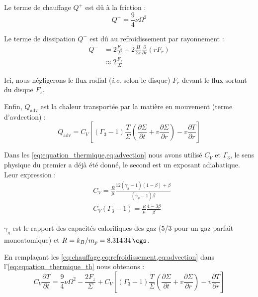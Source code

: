 Le terme de chauffage $Q^+$ est dû à la friction :
\begin{equation}
    \label{eq:chauffage}
    Q^+ = \frac{9}{4} \nu \Omega^2
\end{equation}

Le terme de dissipation $Q^-$ est dû au refroidissement par rayonnement :
\begin{align}
    Q^- &= 2 \frac{F_z}{\Sigma} + 2 \frac{H}{\Sigma r} \frac{\partial}{\partial r} \left(r F_r\right) \\
    \label{eq:refroidissement}
        &\approx 2 \frac{F_z}{\Sigma}
\end{align}

Ici, nous négligerons le flux radial (\textit{i.e.} selon le disque) $F_r$
devant le flux sortant du disque $F_z$.

Enfin, $Q_\mathrm{adv}$ est la chaleur transportée par la matière en mouvement
(terme d’avdection) : 
\begin{equation}
    \label{eq:advection}
    Q_\mathrm{adv} = C_V \left[ (\Gamma_3 - 1) \frac{T}{\Sigma} \left( \frac{\partial \Sigma}{\partial t} + v \frac{\partial \Sigma}{\partial r}  \right) - v \frac{\partial T}{\partial r} \right]
\end{equation}

Dans les \cref{eq:equation_thermique,eq:advection} nous avons utilisé $C_V$ et
$\Gamma_3$, le sens physique du premier a déjà été donné, le second est un
exposant adiabatique. Leur expression :
\begin{align}
    &C_V = \frac{R}{\mu} \frac{12 (\gamma_g - 1)(1 - \beta) + \beta}{(\gamma_g - 1) \beta} \\
    &C_V (\Gamma_3 - 1) = \frac{R}{\mu} \frac{4 - 3\beta}{\beta}
\end{align}

$\gamma_g$ est le rapport des capacités calorifiques des gaz (\num{5/3} pour un
gaz parfait monoatomique) et $R = k_B / m_p = \SI{8.31434}{\cgs}$.

En remplaçant les \cref{eq:chauffage,eq:refroidissement,eq:advection} dans
l’\cref{eq:equation_thermique_th} nous obtenons :
\begin{equation}
    \label{eq:equation_thermique}
    C_V \frac{\partial T}{\partial t} = \frac{9}{4} \nu \Omega^2 - \frac{2 F_z}{\Sigma} + C_V \left[ (\Gamma_3 - 1) \frac{T}{\Sigma} \left( \frac{\partial \Sigma}{\partial t} + v \frac{\partial \Sigma}{\partial r}  \right) - v \frac{\partial T}{\partial r} \right]
\end{equation}

